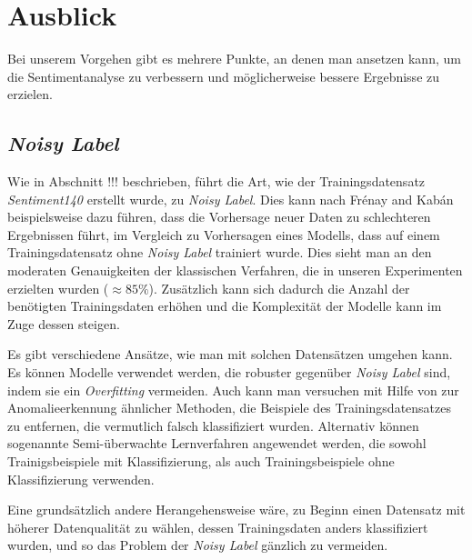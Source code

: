 \section{Ausblick}


Bei unserem Vorgehen gibt es mehrere Punkte, an denen man ansetzen kann, um die Sentimentanalyse zu verbessern und möglicherweise bessere Ergebnisse zu erzielen.

\subsection{\textit{Noisy Label}}
Wie in Abschnitt \label{4.1.1}!!! beschrieben, führt die Art, wie der Trainingsdatensatz \textit{Sentiment140} erstellt wurde, zu \textit{Noisy Label}. Dies kann nach Fr{\'e}nay and Kab{\'a}n \cite{NoisyLabel2014} beispielsweise dazu führen, dass die Vorhersage neuer Daten zu schlechteren Ergebnissen führt, im Vergleich zu Vorhersagen eines Modells, dass auf einem Trainingsdatensatz ohne \textit{Noisy Label} trainiert wurde. Dies sieht man an den moderaten Genauigkeiten der klassischen Verfahren, die in unseren Experimenten erzielten wurden ($\approx{85} \%$). Zusätzlich kann sich dadurch die Anzahl der benötigten Trainingsdaten erhöhen und die Komplexität der Modelle kann im Zuge dessen steigen.

Es gibt verschiedene Ansätze, wie man mit solchen Datensätzen umgehen kann. Es können Modelle verwendet werden, die robuster gegenüber \textit{Noisy Label} sind, indem sie ein \textit{Overfitting} vermeiden. Auch kann man versuchen mit Hilfe von zur Anomalieerkennung ähnlicher Methoden, die Beispiele des Trainingsdatensatzes zu entfernen, die vermutlich falsch klassifiziert wurden. Alternativ können sogenannte Semi-überwachte Lernverfahren angewendet werden, die sowohl Trainigsbeispiele mit Klassifizierung, als auch Trainingsbeispiele ohne Klassifizierung verwenden. 

Eine grundsätzlich andere Herangehensweise wäre, zu Beginn einen Datensatz mit höherer Datenqualität zu wählen, dessen Trainingsdaten anders klassifiziert wurden, und so das Problem der \textit{Noisy Label} gänzlich zu vermeiden.



